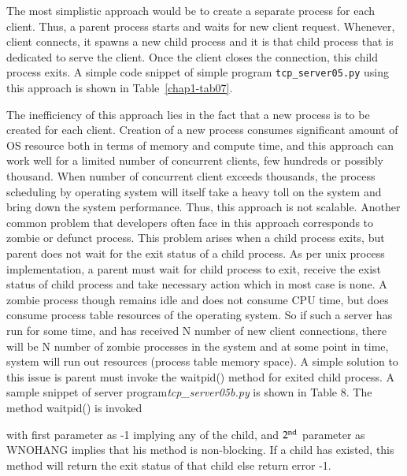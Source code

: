 \begin{multicols}{2}
The most simplistic approach would be to create a separate process for each client. Thus, a parent process starts and waits for new client request. Whenever, client connects, it spawns a new child process and it is that child process that is dedicated to serve the client. Once the client closes the connection, this child process exits. A simple code snippet of simple program \texttt{tcp\_server05.py} \cite{art1-key04} using this approach is shown in Table~\ref{chap1-tab07}.


The inefficiency of this approach lies in the fact that a new process is to be created for each client. Creation of a new process consumes significant amount of OS resource both in terms of memory and compute time, and this approach can work well for a limited number of concurrent clients, few hundreds or possibly thousand. When number of concurrent client exceeds thousands, the process scheduling by operating system will itself take a heavy toll on the system and bring down the system performance. Thus, this approach is not scalable. Another common problem that developers often face in this approach corresponds to zombie or defunct process. This problem arises when a child process exits, but parent does not wait for the exit status of a child process. As per unix process implementation, a parent must wait for child process to exit, receive the exist status of child process and take necessary action which in most case is none. A zombie process though remains idle and does not consume CPU time, but does consume process table resources of the operating system. So if such a server has run for some time, and has received N number of new client connections, there will be N number of zombie processes in the system and at some point in time, system will run out resources (process table memory space). A simple solution to this issue is parent must invoke the waitpid() method for exited child process. A sample snippet of server program\textit{tcp\_server05b.py} is shown in Table 8. The method waitpid() is invoked

with first parameter as -1 implying any of the child, and $2^{\rm nd}$ parameter as WNOHANG implies that his method is non-blocking. If a child has existed, this method will return the exit status of that child else return error -1.


\end{multicols}

